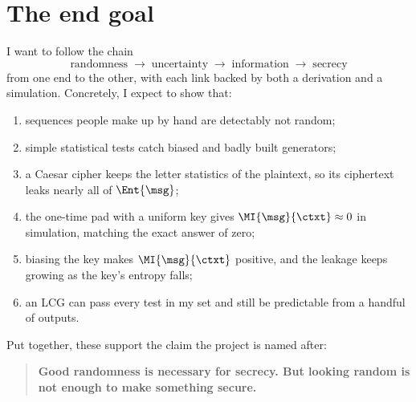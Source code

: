 \section{The end goal}\label{sec:goal}

I want to follow the chain
\[
  \text{randomness} \;\longrightarrow\; \text{uncertainty}
  \;\longrightarrow\; \text{information} \;\longrightarrow\; \text{secrecy}
\]
from one end to the other, with each link backed by both a derivation and a
simulation. Concretely, I expect to show that:
\begin{enumerate}
  \item sequences people make up by hand are detectably not random;
  \item simple statistical tests catch biased and badly built generators;
  \item a Caesar cipher keeps the letter statistics of the plaintext, so its
        ciphertext leaks nearly all of $\Ent{\msg}$;
  \item the one-time pad with a uniform key gives $\MI{\msg}{\ctxt} \approx 0$
        in simulation, matching the exact answer of zero;
  \item biasing the key makes $\MI{\msg}{\ctxt}$ positive, and the leakage
        keeps growing as the key's entropy falls;
  \item an LCG can pass every test in my set and still be predictable from a
        handful of outputs.
\end{enumerate}
Put together, these support the claim the project is named after:
\begin{quote}
  \textbf{Good randomness is necessary for secrecy. But looking random is not
  enough to make something secure.}
\end{quote}
